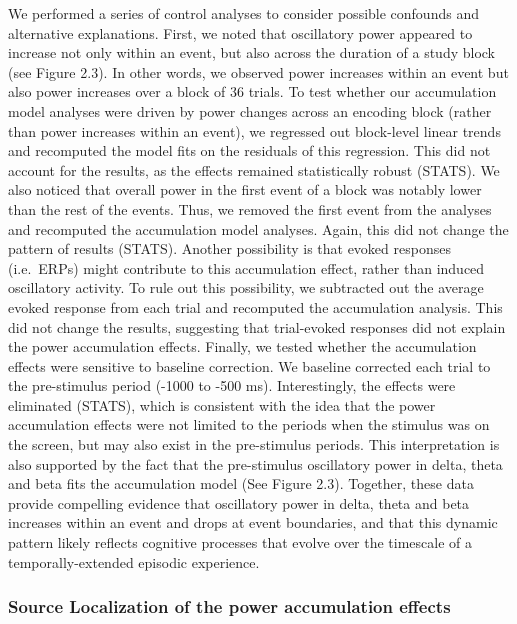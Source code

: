 We performed a series of control analyses to consider possible confounds
and alternative explanations. First, we noted that oscillatory power
appeared to increase not only within an event, but also across the
duration of a study block (see Figure 2.3). In other words, we observed
power increases within an event but also power increases over a block of
36 trials. To test whether our accumulation model analyses were driven
by power changes across an encoding block (rather than power increases
within an event), we regressed out block-level linear trends and
recomputed the model fits on the residuals of this regression. This did
not account for the results, as the effects remained statistically
robust (STATS). We also noticed that overall power in the first event of
a block was notably lower than the rest of the events. Thus, we removed
the first event from the analyses and recomputed the accumulation model
analyses. Again, this did not change the pattern of results (STATS).
Another possibility is that evoked responses (i.e.~ERPs) might
contribute to this accumulation effect, rather than induced oscillatory
activity. To rule out this possibility, we subtracted out the average
evoked response from each trial and recomputed the accumulation
analysis. This did not change the results, suggesting that trial-evoked
responses did not explain the power accumulation effects. Finally, we
tested whether the accumulation effects were sensitive to baseline
correction. We baseline corrected each trial to the pre-stimulus period
(-1000 to -500 ms). Interestingly, the effects were eliminated (STATS),
which is consistent with the idea that the power accumulation effects
were not limited to the periods when the stimulus was on the screen, but
may also exist in the pre-stimulus periods. This interpretation is also
supported by the fact that the pre-stimulus oscillatory power in delta,
theta and beta fits the accumulation model (See Figure 2.3). Together,
these data provide compelling evidence that oscillatory power in delta,
theta and beta increases within an event and drops at event boundaries,
and that this dynamic pattern likely reflects cognitive processes that
evolve over the timescale of a temporally-extended episodic experience.

\subsubsection{Source Localization of the power accumulation
effects}\label{source-localization-of-the-power-accumulation-effects}

